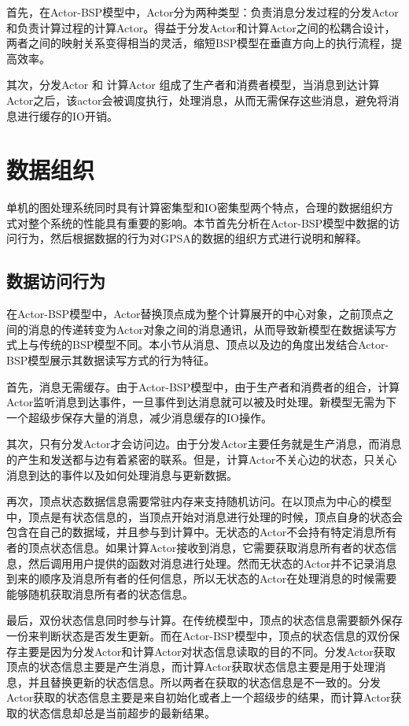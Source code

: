 首先，在Actor-BSP模型中，Actor分为两种类型：负责消息分发过程的分发Actor和负责计算过程的计算Actor。得益于分发Actor和计算Actor之间的松耦合设计，两者之间的映射关系变得相当的灵活，缩短BSP模型在垂直方向上的执行流程，提高效率。

其次，分发Actor 和 计算Actor 组成了生产者和消费者模型，当消息到达计算Actor之后，该actor会被调度执行，处理消息，从而无需保存这些消息，避免将消息进行缓存的IO开销。

\section{数据组织}

单机的图处理系统同时具有计算密集型和IO密集型两个特点，合理的数据组织方式对整个系统的性能具有重要的影响。本节首先分析在Actor-BSP模型中数据的访问行为，然后根据数据的行为对GPSA的数据的组织方式进行说明和解释。

\subsection{数据访问行为}
在Actor-BSP模型中，Actor替换顶点成为整个计算展开的中心对象，之前顶点之间的消息的传递转变为Actor对象之间的消息通讯，从而导致新模型在数据读写方式上与传统的BSP模型不同。本小节从消息、顶点以及边的角度出发结合Actor-BSP模型展示其数据读写方式的行为特征。

首先，消息无需缓存。由于Actor-BSP模型中，由于生产者和消费者的组合，计算Actor监听消息到达事件，一旦事件到达消息就可以被及时处理。新模型无需为下一个超级步保存大量的消息，减少消息缓存的IO操作。

其次，只有分发Actor才会访问边。由于分发Actor主要任务就是生产消息，而消息的产生和发送都与边有着紧密的联系。但是，计算Actor不关心边的状态，只关心消息到达的事件以及如何处理消息与更新数据。

再次，顶点状态数据信息需要常驻内存来支持随机访问。在以顶点为中心的模型中，顶点是有状态信息的，当顶点开始对消息进行处理的时候，顶点自身的状态会包含在自己的数据域，并且参与到计算中。无状态的Actor不会持有特定消息所有者的顶点状态信息。如果计算Actor接收到消息，它需要获取消息所有者的状态信息，然后调用用户提供的函数对消息进行处理。然而无状态的Actor并不记录消息到来的顺序及消息所有者的任何信息，所以无状态的Actor在处理消息的时候需要能够随机获取消息所有者的状态信息。

最后，双份状态信息同时参与计算。在传统模型中，顶点的状态信息需要额外保存一份来判断状态是否发生更新。而在Actor-BSP模型中，顶点的状态信息的双份保存主要是因为分发Actor和计算Actor对状态信息读取的目的不同。分发Actor获取顶点的状态信息主要是产生消息，而计算Actor获取状态信息主要是用于处理消息，并且替换更新的状态信息。所以两者在获取的状态信息是不一致的。分发Actor获取的状态信息主要是来自初始化或者上一个超级步的结果，而计算Actor获取的状态信息却总是当前超步的最新结果。



